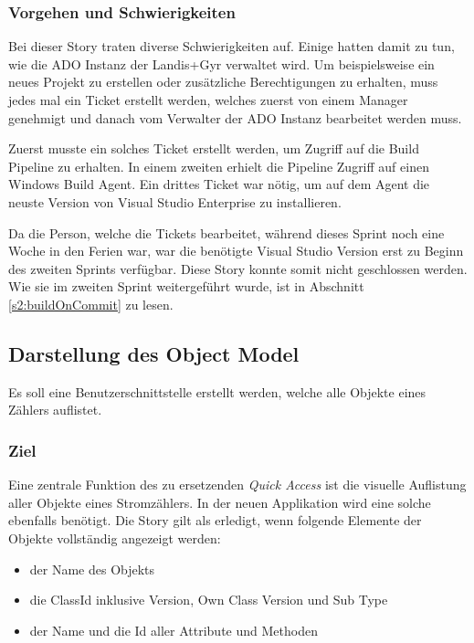\subsubsection{Vorgehen und Schwierigkeiten}
Bei dieser Story traten diverse Schwierigkeiten auf.
Einige hatten damit zu tun, wie die \ac{ADO} Instanz der Landis+Gyr verwaltet wird.
Um beispielsweise ein neues Projekt zu erstellen oder zusätzliche Berechtigungen zu erhalten, muss jedes mal ein Ticket erstellt werden, welches zuerst von einem Manager genehmigt und danach vom Verwalter der \ac{ADO} Instanz bearbeitet werden muss.

Zuerst musste ein solches Ticket erstellt werden, um Zugriff auf die Build Pipeline zu erhalten.
In einem zweiten erhielt die Pipeline Zugriff auf einen Windows Build Agent.
Ein drittes Ticket war nötig, um auf dem Agent die neuste Version von Visual Studio Enterprise zu installieren.

Da die Person, welche die Tickets bearbeitet, während dieses Sprint noch eine Woche in den Ferien war, war die benötigte Visual Studio Version erst zu Beginn des zweiten Sprints verfügbar.
Diese Story konnte somit nicht geschlossen werden.
Wie sie im zweiten Sprint weitergeführt wurde, ist in Abschnitt \ref{s2:buildOnCommit} zu lesen.


\subsection{Darstellung des Object Model}\label{visualizeOM}
\dq Es soll eine Benutzerschnittstelle erstellt werden, welche alle Objekte eines Zählers auflistet.\dq

\subsubsection{Ziel}
Eine zentrale Funktion des zu ersetzenden \textit{Quick Access} ist die visuelle Auflistung aller Objekte eines Stromzählers.
In der neuen Applikation wird eine solche ebenfalls benötigt.
Die Story gilt als erledigt, wenn folgende Elemente der Objekte vollständig angezeigt werden:
\begin{itemize}
   \item der Name des Objekts
   \item die ClassId inklusive Version, Own Class Version und Sub Type
   \item der Name und die Id aller Attribute und Methoden
\end{itemize}

